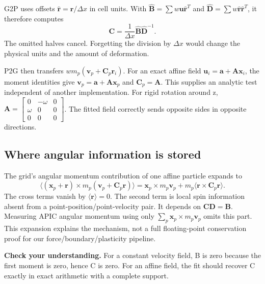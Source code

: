 \documentclass[11pt,a4paper]{article}
\newcommand{\mat}[1]{\mathbf{#1}}
\newcommand{\checkpoint}[1]{\par\textbf{Check your understanding.} #1\par}
\numberwithin{equation}{section}
\begin{document}
G2P uses offsets $\widehat{\mat r}=\mat r/\Delta x$ in cell units. With
$\widehat{\mat B}=\sum w\mat u\widehat{\mat r}^{T}$ and
$\widehat{\mat D}=\sum w\widehat{\mat r}\widehat{\mat r}^{T}$, it therefore computes
\[
\mat C=\frac1{\Delta x}\widehat{\mat B}\widehat{\mat D}^{-1}.
\]
The omitted halves cancel. Forgetting the division by $\Delta x$ would change
the physical units and the amount of deformation.

P2G then transfers $w m_p(\mat v_p+\mat C_p\mat r_i)$.
For an exact affine field $\mat u_i=\mat a+\mat A\mat x_i$, the moment
identities give $\mat v_p=\mat a+\mat A\mat x_p$ and $\mat C_p=\mat A$.
This supplies an analytic test independent of another implementation.
For rigid rotation around z,
$\mat A=\left[\begin{smallmatrix}0&-\omega&0\\\omega&0&0\\0&0&0\end{smallmatrix}\right]$.
The fitted field correctly sends opposite sides in opposite directions.

\subsection{Where angular information is stored}
The grid's angular momentum contribution of one affine particle expands to
\[
\langle(\mat x_p+\mat r)\times m_p(\mat v_p+\mat C_p\mat r)\rangle
=\mat x_p\times m_p\mat v_p
 +m_p\langle\mat r\times\mat C_p\mat r\rangle.
\]
The cross terms vanish by $\langle\mat r\rangle=0$. The second term is local
spin information absent from a point-position/point-velocity pair. It depends
on $\mat C\mat D=\mat B$. Measuring APIC angular momentum using only
$\sum_p\mat x_p\times m_p\mat v_p$ omits this part.
This expansion explains the mechanism, not a full floating-point conservation
proof for our force/boundary/plasticity pipeline.

\checkpoint{For a constant velocity field, B is zero because the first moment
is zero, hence C is zero. For an affine field, the fit should recover C exactly
in exact arithmetic with a complete support.}
\end{document}
